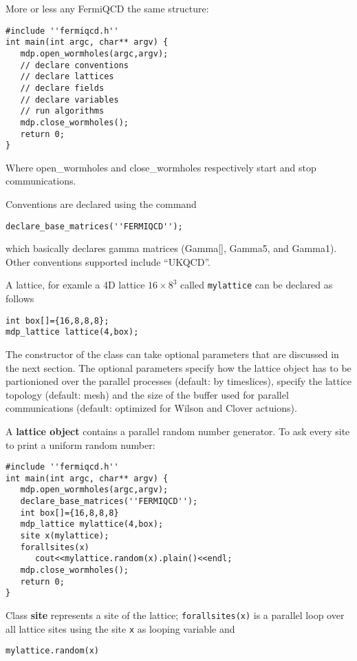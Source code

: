More or less any FermiQCD the same structure:
\begin{verbatim}
#include ''fermiqcd.h''
int main(int argc, char** argv) {
   mdp.open_wormholes(argc,argv);
   // declare conventions
   // declare lattices
   // declare fields
   // declare variables
   // run algorithms
   mdp.close_wormholes();
   return 0;
}
\end{verbatim}

Where open\_wormholes and close\_wormholes respectively start and stop
communications.

Conventions are declared using the command
\begin{verbatim}
declare_base_matrices(''FERMIQCD'');
\end{verbatim}

which basically declares gamma matrices (Gamma[], Gamma5, and Gamma1). Other
conventions supported include ``UKQCD''.

A lattice, for examle a 4D lattice $16\times 8^3$ called {\tt mylattice} can
be declared as follows
\begin{verbatim}
int box[]={16,8,8,8};
mdp_lattice lattice(4,box);
\end{verbatim}

The constructor of the class can take optional parameters that are discussed
in the next section. The optional parameters specify how the lattice object
has to be partionioned over the parallel processes (default: by timeslices),
specify the lattice topology (default: mesh) and the size of the buffer used
for parallel communications (default: optimized for Wilson and Clover
actuions).

A {\bf lattice object} contains a parallel random number generator. To ask
every site to print a uniform random number:
\begin{verbatim}
#include ''fermiqcd.h''
int main(int argc, char** argv) {
   mdp.open_wormholes(argc,argv);
   declare_base_matrices(''FERMIQCD'');
   int box[]={16,8,8,8}
   mdp_lattice mylattice(4,box);
   site x(mylattice);
   forallsites(x) 
      cout<<mylattice.random(x).plain()<<endl;
   mdp.close_wormholes();
   return 0;
}
\end{verbatim}

Class {\bf site} represents a site of the lattice; {\tt forallsites(x)} is a
parallel loop over all lattice sites using the site {\tt x} as looping
variable and 
\begin{verbatim}
mylattice.random(x)
\end{verbatim}

